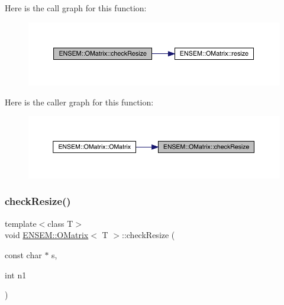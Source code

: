 Here is the call graph for this function\+:
\nopagebreak
\begin{figure}[H]
\begin{center}
\leavevmode
\includegraphics[width=350pt]{dd/d80/classENSEM_1_1OMatrix_a04fb9c7a5ca8da8a54aff3a8bafec571_cgraph}
\end{center}
\end{figure}
Here is the caller graph for this function\+:
\nopagebreak
\begin{figure}[H]
\begin{center}
\leavevmode
\includegraphics[width=350pt]{dd/d80/classENSEM_1_1OMatrix_a04fb9c7a5ca8da8a54aff3a8bafec571_icgraph}
\end{center}
\end{figure}
\mbox{\label{classENSEM_1_1OMatrix_a04fb9c7a5ca8da8a54aff3a8bafec571}} 
\subsubsection{\texorpdfstring{checkResize()}{checkResize()}\hspace{0.1cm}{\footnotesize\ttfamily [2/9]}}
{\footnotesize\ttfamily template$<$class T$>$ \\
void \mbox{\hyperlink{classENSEM_1_1OMatrix}{E\+N\+S\+E\+M\+::\+O\+Matrix}}$<$ T $>$\+::check\+Resize (\begin{DoxyParamCaption}\item[{const char $\ast$}]{s,  }\item[{int}]{n1 }\end{DoxyParamCaption})\hspace{0.3cm}{\ttfamily [inline]}}

